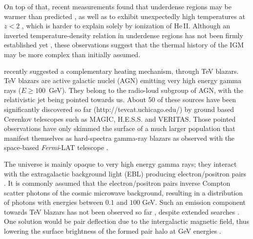 \documentclass[numberedappendix]{emulateapj}
\begin{document}
On top of that, recent measurements found that underdense regions may be warmer than predicted \citep{2009MNRAS.399L..39V,2008MNRAS.386.1131B}, as well as to exhibit unexpectedly high temperatures at $z<2$ \citep{2014MNRAS.441.1916B}, which is harder to explain solely by ionization of He\,\textsc{II}. Although an inverted temperature-density relation in underdense regions has not been firmly established yet \citep{2014MNRAS.438.2499B}, these observations suggest that the thermal history of the IGM may be more complex than initially assumed.

\citet{2012ApJ...752...22B} recently suggested a complementary heating mechanism, through TeV blazars. TeV blazars are active galactic nuclei (AGN) emitting very high energy gamma rays ($E\ge100$~GeV). They belong to the radio-loud subgroup of AGN, with the relativistic jet being pointed towards us. About 50 of these sources have been significantly discovered so far (http://tevcat.uchicago.edu/) by ground based Cerenkov telescopes such as MAGIC, H.E.S.S. and VERITAS. Those pointed observations have only skimmed the surface of a much larger population that manifest themselves as hard-spectra gamma-ray blazars as observed with the space-based \textit{Fermi}-LAT telescope \citep{2014ApJ...790..137B}. 

The universe is mainly opaque to very high energy gamma rays; they interact with the extragalactic background light (EBL) producing electron/positron pairs \citep{1967PhRv..155.1408G,1992ApJ...390L..49S}. It is commonly assumed that the electron/positron pairs inverse Compton scatter photons of the cosmic microwave background, resulting in a distribution of photons with energies between $0.1$ and $100$ GeV. Such an emission component towards TeV blazars has not been observed so far \citep{2010A&A...524A..77A}, despite extended searches \citep{2014A&A...562A.145H}. One solution would be pair deflection due to the intergalactic magnetic field, thus lowering the surface brightness of the formed pair halo at GeV energies \citep{2013A&ARv..21...62D,2012ApJ...747L..14V,2011ApJ...733L..21D}. 
\end{document}
